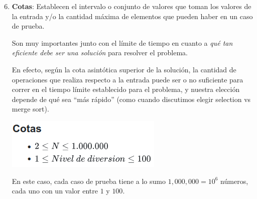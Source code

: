 \documentclass{beamer}
\begin{document}
    \begin{frame}[noframenumbering]
        \begin{enumerate}
            \setcounter{enumi}{5}
            \item \textbf{Cotas}: \pause Establecen el intervalo o conjunto de valores que toman los valores de la entrada y/o la cantidad máxima de elementos que pueden haber en un caso de prueba. \pause 

            Son muy importantes junto con el límite de tiempo en cuanto a \textit{qué tan eficiente debe ser una solución} para resolver el problema. \pause 

            En efecto, según la cota asintótica superior de la solución, la cantidad de operaciones que realiza respecto a la entrada puede ser o no suficiente para correr en el tiempo límite establecido para el problema, y nuestra elección depende de qué sea ``más rápido'' (como cuando discutimos elegir selection vs merge sort).\pause
            \begin{center}
                \includegraphics[width=.4\linewidth]{./ou_restrictions.png}
            \end{center}\pause

            En este caso, cada caso de prueba tiene a lo sumo $1,000,000 = 10^6$ números, cada uno con un valor entre $1$ y $100$.
        \end{enumerate}
    \end{frame}
 
\end{document}
